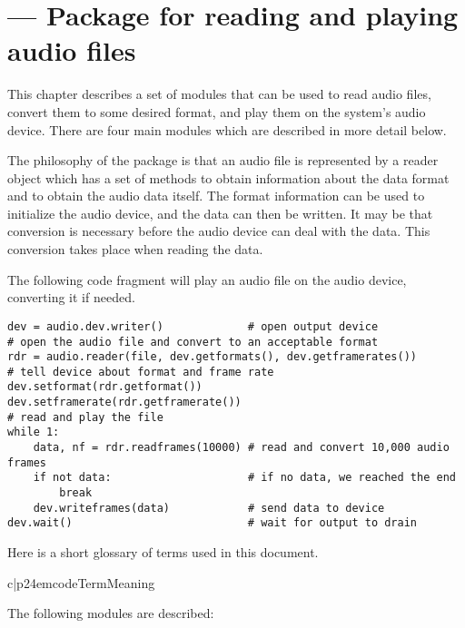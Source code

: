 \section{ ---
	 Package for reading and playing audio files}


This chapter describes a set of modules that can be used to read audio
files, convert them to some desired format, and play them on the
system's audio device.  There are four main modules which are
described in more detail below.

The philosophy of the package is that an audio file is represented by
a reader object which has a set of methods to obtain information about
the data format and to obtain the audio data itself.  The format
information can be used to initialize the audio device, and the data
can then be written.  It may be that conversion is necessary before
the audio device can deal with the data.  This conversion takes place
when reading the data.

The following code fragment will play an audio file on the audio
device, converting it if needed.

\begin{verbatim}
dev = audio.dev.writer()             # open output device
# open the audio file and convert to an acceptable format
rdr = audio.reader(file, dev.getformats(), dev.getframerates())
# tell device about format and frame rate
dev.setformat(rdr.getformat())
dev.setframerate(rdr.getframerate())
# read and play the file
while 1:
    data, nf = rdr.readframes(10000) # read and convert 10,000 audio frames
    if not data:                     # if no data, we reached the end
        break
    dev.writeframes(data)            # send data to device
dev.wait()                           # wait for output to drain
\end{verbatim}

Here is a short glossary of terms used in this document.

\begin{tableii}{c|p{24em}}{code}{Term}{Meaning}
\end{tableii}

The following modules are described:

